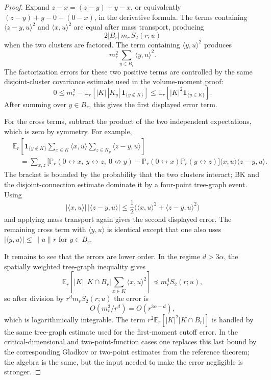 \documentclass[11pt,reqno]{book}
\numberwithin{equation}{chapter}
\theoremstyle{plain}
\theoremstyle{definition}
\theoremstyle{remark}
\newcommand{\1}{\mathbf 1}
\begin{document}
\begin{proof}
Expand \(z-x=(z-y)+y-x\), or equivalently
\((z-y)+y-0+(0-x)\), in the derivative formula. The terms containing
\(\langle z-y,u\rangle^2\) and \(\langle x,u\rangle^2\) are equal after
mass transport, producing
\[
  2|B_r|\,m_r\,S_2(r;u)
\]
when the two clusters are factored. The term containing
\(\langle y,u\rangle^2\) produces
\[
  m_r^2\sum_{y\in B_r}\langle y,u\rangle^2.
\]
The factorization errors for these two positive terms are controlled by the
same disjoint-cluster covariance estimate used in the volume-moment proof:
\[
  0\leq
  m_r^2-
  \mathbb E_r\!\left[
    |K|\,|K_y|\,
    \1_{\{y\notin K\}}
  \right]
  \leq
  \mathbb E_r[|K|^2\1_{\{y\in K\}}].
\]
After summing over \(y\in B_r\), this gives the first displayed error term.

For the cross terms, subtract the product of the two independent expectations,
which is zero by symmetry. For example,
\[
\begin{aligned}
&\mathbb E_r\!\left[
  \1_{\{y\notin K\}}
  \sum_{x\in K}\langle x,u\rangle
  \sum_{z\in K_y}\langle z-y,u\rangle
\right]  \\
&\quad =
\sum_{x,z}
\bigl[
  \mathbb P_r(0\leftrightarrow x,\ y\leftrightarrow z,\ 0\not\leftrightarrow y)
  -
  \mathbb P_r(0\leftrightarrow x)\mathbb P_r(y\leftrightarrow z)
\bigr]
\langle x,u\rangle\langle z-y,u\rangle .
\end{aligned}
\]
The bracket is bounded by the probability that the two clusters interact;
BK and the disjoint-connection estimate dominate it by a four-point
tree-graph event. Using
\[
  |\langle x,u\rangle|\,|\langle z-y,u\rangle|
  \leq
  \frac12\bigl(\langle x,u\rangle^2+\langle z-y,u\rangle^2\bigr)
\]
and applying mass transport again gives the second displayed error. The
remaining cross term with \(\langle y,u\rangle\) is identical except that one
also uses \(|\langle y,u\rangle|\leq \|u\|r\) for \(y\in B_r\).

It remains to see that the errors are lower order. In the regime \(d>3\alpha\),
the spatially weighted tree-graph inequality gives
\[
  \mathbb E_r\!\left[
    |K|\,|K\cap B_r|
    \sum_{x\in K}\langle x,u\rangle^2
  \right]
  \preceq
  m_r^4 S_2(r;u),
\]
so after division by \(r^d m_r S_2(r;u)\) the error is
\[
  O(m_r^3/r^d)=O(r^{3\alpha-d}),
\]
which is logarithmically integrable. The term
\(r^2\mathbb E_r[|K|^2|K\cap B_r|]\) is handled by the same tree-graph
estimate used for the first-moment cutoff error. In the critical-dimensional
and two-point-function cases one replaces this last bound by the corresponding
Gladkov or two-point estimates from the reference theorem; the algebra is the
same, but the input needed to make the error negligible is stronger.
\end{proof}
\end{document}
